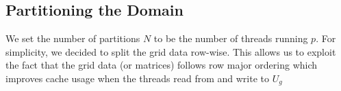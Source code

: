\documentclass{article}
\begin{document}


\subsection{Partitioning the Domain}
We set the number of partitions $N$ to be the number of threads running $p$. For simplicity, we decided to split 
the grid data row-wise. This allows us to exploit the fact that the grid data (or matrices) follows row major ordering which  
improves cache usage when the threads read from and write to $U_g$








\end{document}
